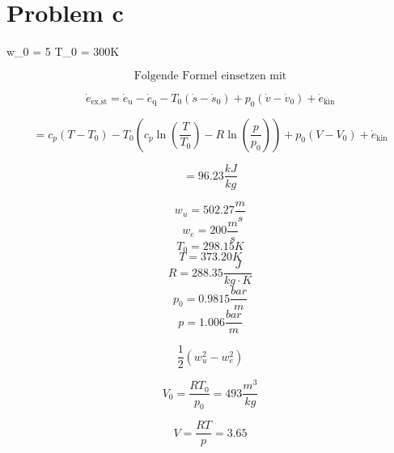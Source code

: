 \section*{Problem c}

 \quad w_0 = 5  \quad T_0 = 300K

\[
\text{Folgende Formel einsetzen mit}
\]

\[
\dot{e}_{\text{ex,st}} = \dot{e}_{\text{u}} - \dot{e}_{\text{q}} - T_0 (\dot{s} - \dot{s}_0) + p_0 (\dot{v} - \dot{v}_0) + \dot{e}_{\text{kin}}
\]

\[
= c_p (T - T_0) - T_0 \left( c_p \ln \left( \frac{T}{T_0} \right) - R \ln \left( \frac{p}{p_0} \right) \right) + p_0 (V - V_0) + \dot{e}_{\text{kin}}
\]

\[
= \boxed{96.23 \frac{kJ}{kg}}
\]

\[
w_u = 502.27 \frac{m}{s}
\]
\[
w_e = 200 \frac{m}{s}
\]
\[
T_0 = 298.15 K
\]
\[
T = 373.20 K
\]
\[
R = 288.35 \frac{J}{kg \cdot K}
\]
\[
p_0 = 0.9815 \frac{bar}{m}
\]
\[
p = 1.006 \frac{bar}{m}
\]

\[
\frac{1}{2} (w_u^2 - w_e^2)
\]

\[
V_0 = \frac{RT_0}{p_0} = 493 \frac{m^3}{kg}
\]

\[
V = \frac{RT}{p} = 3.65
\]